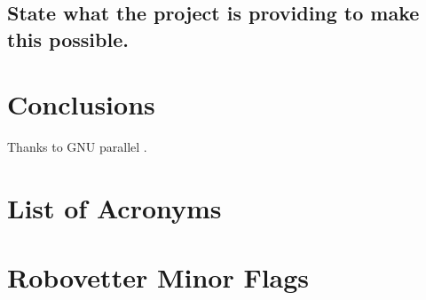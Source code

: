 \documentclass[onecolumn]{aastex6}
\begin{document}
\subsection{State what the project is providing to make this possible.}


\section{Conclusions}

\acknowledgments
Thanks to GNU parallel \citep{Tange2011a}.

\appendix
\section{List of Acronyms}

\section{Robovetter Minor Flags}
%


\end{document}
